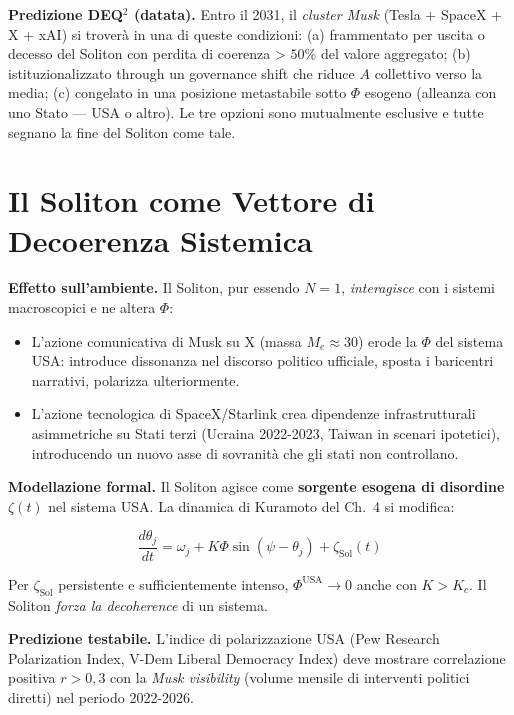 \Conj{} \textbf{Predizione DEQ$^2$ (datata).} Entro il 2031, il
\emph{cluster Musk} (Tesla + SpaceX + X + xAI) si troverà in una di
queste condizioni: (a) frammentato per uscita o decesso del Soliton con
perdita di coerenza \textgreater{} \(50\%\) del valore aggregato; (b)
istituzionalizzato through un governance shift che riduce \(A\)
collettivo verso la media; (c) congelato in una posizione metastabile
sotto \(\Phi\) esogeno (alleanza con uno Stato --- USA o altro). Le tre
opzioni sono mutualmente esclusive e tutte segnano la fine del Soliton
come tale.



\section{Il Soliton come Vettore di Decoerenza
Sistemica}\label{il-solitone-come-vettore-di-decoherence-sistemica}

\Hypoth{} \textbf{Effetto sull'ambiente.} Il Soliton, pur essendo
\(N = 1\), \emph{interagisce} con i sistemi macroscopici e ne altera
\(\Phi\):

\begin{itemize}
\tightlist
\item
  L'azione comunicativa di Musk su X (massa \(M_e \approx 30\)) erode la
  \(\Phi\) del sistema USA: introduce dissonanza nel discorso politico
  ufficiale, sposta i baricentri narrativi, polarizza ulteriormente.
\item
  L'azione tecnologica di SpaceX/Starlink crea dipendenze
  infrastrutturali asimmetriche su Stati terzi (Ucraina 2022-2023,
  Taiwan in scenari ipotetici), introducendo un nuovo asse di sovranità
  che gli stati non controllano.
\end{itemize}

\Proved{} \textbf{Modellazione formal.} Il Soliton agisce come
\textbf{sorgente esogena di disordine} \(\zeta(t)\) nel sistema USA. La
dinamica di Kuramoto del Ch.~4 si modifica:

\[
\frac{d\theta_j}{dt} = \omega_j + K\Phi \sin(\psi - \theta_j) + \zeta_{\text{Sol}}(t)
\]

Per \(\zeta_{\text{Sol}}\) persistente e sufficientemente intenso,
\(\Phi^{\text{USA}} \to 0\) anche con \(K > K_c\). Il Soliton
\emph{forza la decoherence} di un sistema.

\Conj{} \textbf{Predizione testabile.} L'indice di polarizzazione USA
(Pew Research Polarization Index, V-Dem Liberal Democracy Index) deve
mostrare correlazione positiva \(r > 0{,}3\) con la \emph{Musk
visibility} (volume mensile di interventi politici diretti) nel periodo
2022-2026.




